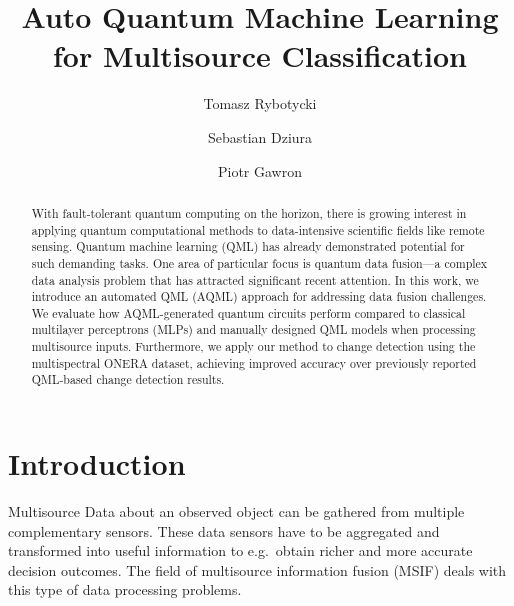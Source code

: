 \documentclass[runningheads]{llncs}
\begin{document}
%
\title{Auto Quantum Machine Learning for Multisource Classification}

\author{Tomasz Rybotycki \and
	Sebastian Dziura \and
	Piotr Gawron}
%
%
%
\maketitle              %
%
\begin{abstract}
		With fault-tolerant quantum computing on the horizon, there is growing interest in applying quantum computational methods to data-intensive scientific fields like remote sensing. Quantum machine learning (QML) has already demonstrated potential for such demanding tasks.
		One area of particular focus is quantum data fusion—a complex data analysis problem that has attracted significant recent attention.
		In this work, we introduce an automated QML (AQML) approach for addressing data fusion challenges. We evaluate how AQML-generated quantum circuits perform compared to classical multilayer perceptrons (MLPs) and manually designed QML models when processing multisource inputs.
		Furthermore, we apply our method to change detection using the multispectral ONERA dataset, achieving improved accuracy over previously reported QML-based change detection results.




\end{abstract}
%
%
\section{Introduction}
Multisource Data about an observed object can be gathered from multiple
complementary sensors. These data sensors have to be
aggregated and transformed into useful information to e.g.\ obtain richer and
more accurate decision outcomes. The field of multisource information fusion (MSIF) deals with this type of data processing problems.
\end{document}

